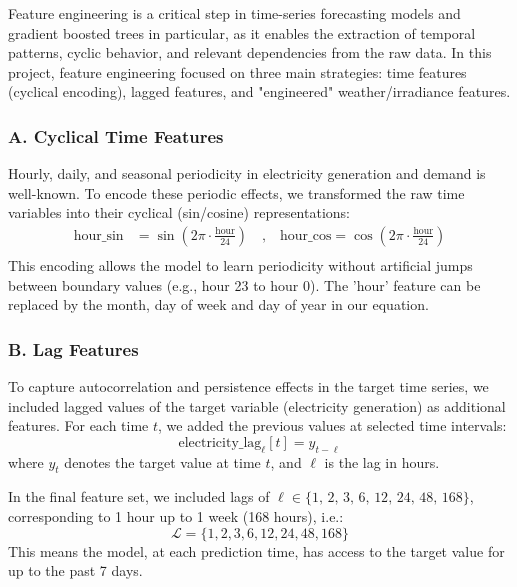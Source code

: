 Feature engineering is a critical step in time-series forecasting models and gradient 
boosted trees in particular, as it enables the extraction of temporal patterns, cyclic 
behavior, and relevant dependencies from the raw data. In this project, feature 
engineering focused on three main strategies: time features (cyclical encoding), 
lagged features, and "engineered" weather/irradiance features.

\subsubsection*{A. Cyclical Time Features}
Hourly, daily, and seasonal periodicity in electricity generation and demand is well-known. 
To encode these periodic effects, we transformed the raw time variables into their 
cyclical (sin/cosine) representations:
\[
\begin{aligned}
\text{hour\_sin}  &= \sin\left(2\pi \cdot \frac{\text{hour}}{24}\right) 
\quad \text{,} \quad 
\text{hour\_cos}  = \cos\left(2\pi \cdot \frac{\text{hour}}{24}\right) \\
\end{aligned}
\]
This encoding allows the model to learn periodicity without artificial jumps between 
boundary values (e.g., hour 23 to hour 0). The 'hour' feature can be replaced by the 
month, day of week and day of year in our equation.

\subsubsection*{B. Lag Features}
To capture autocorrelation and persistence effects in the target time series, we 
included lagged values of the target variable (electricity generation) as additional 
features. For each time $t$, we added the previous values at selected time intervals:
\[
\text{electricity\_lag}_\ell[t] = y_{t-\ell}
\]
where $y_t$ denotes the target value at time $t$, and $\ell$ is the lag in hours.

In the final feature set, we included lags of $\ell \in \{1,\, 2,\, 3,\, 6,\, 
12,\, 24,\, 48,\, 168\}$, corresponding to 1 hour up to 1 week (168 hours), i.e.:
\[
\mathcal{L} = \{1, 2, 3, 6, 12, 24, 48, 168\}
\]
This means the model, at each prediction time, has access to the target value for up 
to the past 7 days.

